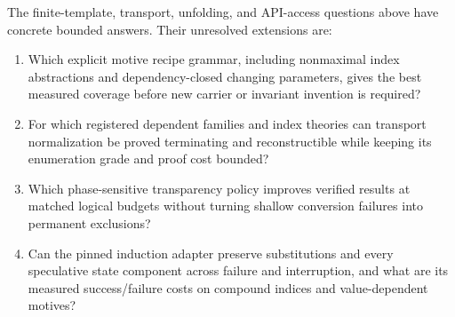 The finite-template, transport, unfolding, and API-access questions above have
concrete bounded answers. Their unresolved extensions are:
\begin{enumerate}[label=R4.N\arabic*.]
\item Which explicit motive recipe grammar, including nonmaximal index
abstractions and dependency-closed changing parameters, gives the best measured
coverage before new carrier or invariant invention is required?
\item For which registered dependent families and index theories can transport
normalization be proved terminating and reconstructible while keeping its
enumeration grade and proof cost bounded?
\item Which phase-sensitive transparency policy improves verified results at
matched logical budgets without turning shallow conversion failures into
permanent exclusions?
\item Can the pinned induction adapter preserve substitutions and every
speculative state component across failure and interruption, and what are its
measured success/failure costs on compound indices and value-dependent motives?
\end{enumerate}
